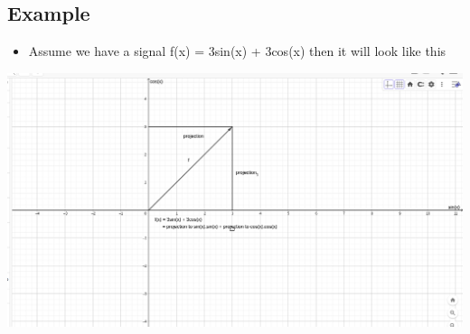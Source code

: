 \documentclass[11pt]{article}
\begin{document}
\subsection{Example}
\label{sec:org2e3cead}
\begin{itemize}
\item Assume we have a signal f(x) = 3sin(x) + 3cos(x) then it will look like this
\end{itemize}
\begin{center}
\includegraphics[width=.9\linewidth]{./ggv.png}
\end{center}
\end{document}

